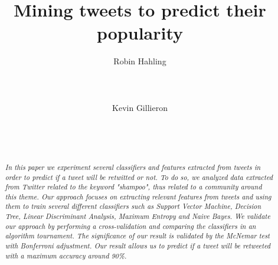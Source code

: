 \documentclass{sigchi}
\begin{document}
\title{Mining tweets to predict their popularity}

\author{
  \alignauthor Robin Hahling\\
    \\
    \\
    \\
  \alignauthor Kevin Gillieron\\
    \\
    \\
    \\
}

\maketitle

\begin{abstract}
\textit{
In this paper we experiment several classifiers and features extracted from
tweets in order to predict if a tweet will be retwitted or not.
To do so, we analyzed data extracted from Twitter related to the keyword
"shampoo", thus related to a community around this theme.
Our approach focuses on extracting relevant features from tweets and using them
to train several different classifiers such as Support Vector Machine, Decision
Tree, Linear Discriminant Analysis, Maximum Entropy and Naive Bayes.
We validate our approach by performing a cross-validation and comparing the
classifiers in an algorithm tournament. The significance of our result is
validated by the McNemar test with Bonferroni adjustment.
Our result allows us to predict if a tweet will be retweeted with a maximum 
accuracy around 90\%.
}
\end{abstract}









%
%
%
%
%
\balance



\nocite{*}
\end{document}
